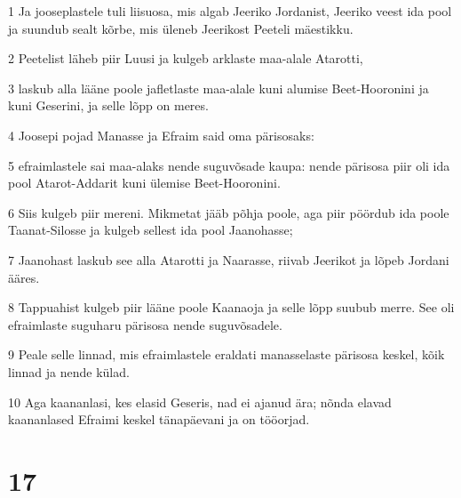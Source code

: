 \par 1 Ja jooseplastele tuli liisuosa, mis algab Jeeriko Jordanist, Jeeriko veest ida pool ja suundub sealt kõrbe, mis üleneb Jeerikost Peeteli mäestikku.
\par 2 Peetelist läheb piir Luusi ja kulgeb arklaste maa-alale Atarotti,
\par 3 laskub alla lääne poole jafletlaste maa-alale kuni alumise Beet-Hooronini ja kuni Geserini, ja selle lõpp on meres.
\par 4 Joosepi pojad Manasse ja Efraim said oma pärisosaks:
\par 5 efraimlastele sai maa-alaks nende suguvõsade kaupa: nende pärisosa piir oli ida pool Atarot-Addarit kuni ülemise Beet-Hooronini.
\par 6 Siis kulgeb piir mereni. Mikmetat jääb põhja poole, aga piir pöördub ida poole Taanat-Silosse ja kulgeb sellest ida pool Jaanohasse;
\par 7 Jaanohast laskub see alla Atarotti ja Naarasse, riivab Jeerikot ja lõpeb Jordani ääres.
\par 8 Tappuahist kulgeb piir lääne poole Kaanaoja ja selle lõpp suubub merre. See oli efraimlaste suguharu pärisosa nende suguvõsadele.
\par 9 Peale selle linnad, mis efraimlastele eraldati manasselaste pärisosa keskel, kõik linnad ja nende külad.
\par 10 Aga kaananlasi, kes elasid Geseris, nad ei ajanud ära; nõnda elavad kaananlased Efraimi keskel tänapäevani ja on tööorjad.

\chapter{17}

